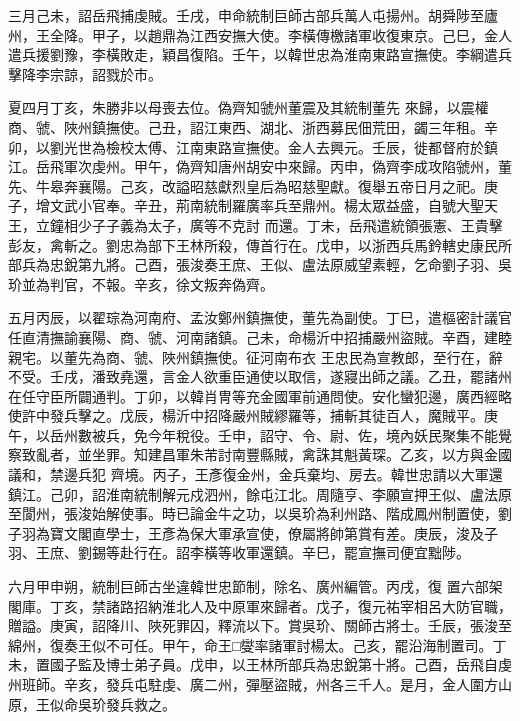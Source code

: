 \begin{pinyinscope}
 三月己未，詔岳飛捕虔賊。壬戌，申命統制巨師古部兵萬人屯揚州。胡舜陟至廬州，王全降。甲子，以趙鼎為江西安撫大使。李橫傳檄諸軍收復東京。己巳，金人遣兵援劉豫，李橫敗走，穎昌復陷。壬午，以韓世忠為淮南東路宣撫使。李綱遣兵擊降李宗諒，詔戮於市。



 夏四月丁亥，朱勝非以母喪去位。偽齊知虢州董震及其統制董先
 來歸，以震權商、虢、陜州鎮撫使。己丑，詔江東西、湖北、浙西募民佃荒田，蠲三年租。辛卯，以劉光世為檢校太傅、江南東路宣撫使。金人去興元。壬辰，徙都督府於鎮江。岳飛軍次虔州。甲午，偽齊知唐州胡安中來歸。丙申，偽齊李成攻陷虢州，董先、牛皋奔襄陽。己亥，改謚昭慈獻烈皇后為昭慈聖獻。復舉五帝日月之祀。庚子，增文武小官奉。辛丑，荊南統制羅廣率兵至鼎州。楊太眾益盛，自號大聖天王，立鐘相少子子義為太子，廣等不克討
 而還。丁未，岳飛遣統領張憲、王貴擊彭友，禽斬之。劉忠為部下王林所殺，傳首行在。戊申，以浙西兵馬鈐轄史康民所部兵為忠銳第九將。己酉，張浚奏王庶、王似、盧法原威望素輕，乞命劉子羽、吳玠並為判官，不報。辛亥，徐文叛奔偽齊。



 五月丙辰，以翟琮為河南府、孟汝鄭州鎮撫使，董先為副使。丁巳，遣樞密計議官任直清撫諭襄陽、商、虢、河南諸鎮。己未，命楊沂中招捕嚴州盜賊。辛酉，建睦親宅。以董先為商、虢、陜州鎮撫使。征河南布衣
 王忠民為宣教郎，至行在，辭不受。壬戌，潘致堯還，言金人欲重臣通使以取信，遂寢出師之議。乙丑，罷諸州在任守臣所闢通判。丁卯，以韓肖冑等充金國軍前通問使。安化蠻犯邊，廣西經略使許中發兵擊之。戊辰，楊沂中招降嚴州賊繆羅等，捕斬其徒百人，魔賊平。庚午，以岳州數被兵，免今年稅役。壬申，詔守、令、尉、佐，境內妖民聚集不能覺察致亂者，並坐罪。知建昌軍朱芾討南豐縣賊，禽誅其魁黃琛。乙亥，以方與金國議和，禁邊兵犯
 齊境。丙子，王彥復金州，金兵棄均、房去。韓世忠請以大軍還鎮江。己卯，詔淮南統制解元戍泗州，餘屯江北。周隨亨、李願宣押王似、盧法原至閬州，張浚始解使事。時已論金牛之功，以吳玠為利州路、階成鳳州制置使，劉子羽為寶文閣直學士，王彥為保大軍承宣使，僚屬將帥第賞有差。庚辰，浚及子羽、王庶、劉錫等赴行在。詔李橫等收軍還鎮。辛巳，罷宣撫司便宜黜陟。



 六月甲申朔，統制巨師古坐違韓世忠節制，除名、廣州編管。丙戌，復
 置六部架閣庫。丁亥，禁諸路招納淮北人及中原軍來歸者。戊子，復元祐宰相呂大防官職，贈謚。庚寅，詔降川、陜死罪囚，釋流以下。賞吳玠、關師古將士。壬辰，張浚至綿州，復奏王似不可任。甲午，命王□燮率諸軍討楊太。己亥，罷沿海制置司。丁未，置國子監及博士弟子員。戊申，以王林所部兵為忠銳第十將。己酉，岳飛自虔州班師。辛亥，發兵屯駐虔、廣二州，彈壓盜賊，州各三千人。是月，金人圍方山原，王似命吳玠發兵救之。




\end{pinyinscope}
